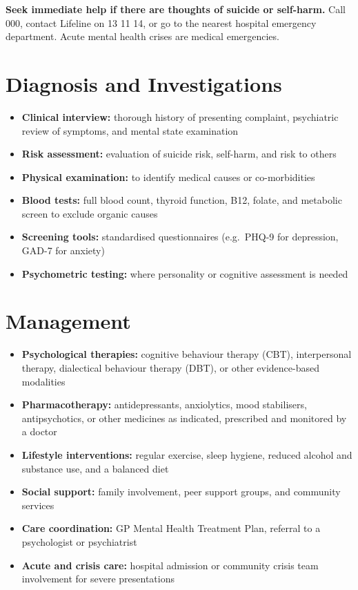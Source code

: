 \textbf{Seek immediate help if there are thoughts of suicide or self-harm.} Call 000, contact Lifeline on 13 11 14, or go to the nearest hospital emergency department. Acute mental health crises are medical emergencies.

\section*{Diagnosis and Investigations}
\begin{itemize}
    \item \textbf{Clinical interview:} thorough history of presenting complaint, psychiatric review of symptoms, and mental state examination
    \item \textbf{Risk assessment:} evaluation of suicide risk, self-harm, and risk to others
    \item \textbf{Physical examination:} to identify medical causes or co-morbidities
    \item \textbf{Blood tests:} full blood count, thyroid function, B12, folate, and metabolic screen to exclude organic causes
    \item \textbf{Screening tools:} standardised questionnaires (e.g.\ PHQ-9 for depression, GAD-7 for anxiety)
    \item \textbf{Psychometric testing:} where personality or cognitive assessment is needed
\end{itemize}

\section*{Management}
\begin{itemize}
    \item \textbf{Psychological therapies:} cognitive behaviour therapy (CBT), interpersonal therapy, dialectical behaviour therapy (DBT), or other evidence-based modalities
    \item \textbf{Pharmacotherapy:} antidepressants, anxiolytics, mood stabilisers, antipsychotics, or other medicines as indicated, prescribed and monitored by a doctor
    \item \textbf{Lifestyle interventions:} regular exercise, sleep hygiene, reduced alcohol and substance use, and a balanced diet
    \item \textbf{Social support:} family involvement, peer support groups, and community services
    \item \textbf{Care coordination:} GP Mental Health Treatment Plan, referral to a psychologist or psychiatrist
    \item \textbf{Acute and crisis care:} hospital admission or community crisis team involvement for severe presentations
\end{itemize}

